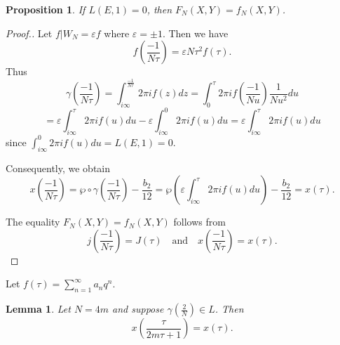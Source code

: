 \documentclass[10pt, a4paper]{article}
\newtheorem{lemma}[theorem]{Lemma}
\newtheorem{proposition}[theorem]{Proposition}
\begin{document}
\begin{proposition}
If $L(E, 1) = 0$, then $F_N(X, Y) = f_N(X, Y)$.
\end{proposition}

\begin{proof}[Proof.]
Let $f|W_N = \varepsilon f$ where $\varepsilon = \pm 1$. Then we have
\[
f\left(\frac{-1}{N\tau}\right) = \varepsilon N\tau^2 f(\tau).
\]
Thus
\[
\gamma\left(\frac{-1}{N\tau}\right) = \int_{i\infty}^{\frac{-1}{N\tau}} 2\pi i f(z) dz = \int_0^\tau 2\pi i f\left(\frac{-1}{Nu}\right) \frac{1}{Nu^2} du
\]
\[
= \varepsilon \int_{i\infty}^\tau 2\pi i f(u) du - \varepsilon \int_{i\infty}^0 2\pi i f(u) du = \varepsilon \int_{i\infty}^\tau 2\pi i f(u) du
\]
since $\int_{i\infty}^0 2\pi i f(u) du = L(E, 1) = 0$.

Consequently, we obtain
\[
x\left(\frac{-1}{N\tau}\right) = \wp \circ \gamma\left(\frac{-1}{N\tau}\right) - \frac{b_2}{12} = \wp\left(\varepsilon \int_{i\infty}^\tau 2\pi i f(u) du\right) - \frac{b_2}{12} = x(\tau).
\]

The equality $F_N(X, Y) = f_N(X, Y)$ follows from
\[
j\left(\frac{-1}{N\tau}\right) = J(\tau) \quad \text{and} \quad x\left(\frac{-1}{N\tau}\right) = x(\tau).
\]
\end{proof}


Let $f(\tau) = \sum_{n=1}^{\infty} a_n q^n$.

\begin{lemma}
Let $N = 4m$ and suppose $\gamma\left(\frac{2}{N}\right) \in L$. Then
\begin{equation}
x\left(\frac{\tau}{2m\tau + 1}\right) = x(\tau).\end{equation}
\end{lemma}
\end{document}

